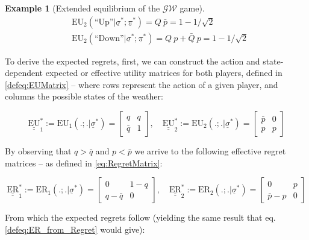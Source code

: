 \documentclass{article}
\theoremstyle{definition}
\newtheorem*{example}{Example}
\begin{document}
\begin{example}[Extended equilibrium of the $\mathcal{GW}$ game]
\begin{equation}
\begin{split}
& \mathrm{EU}_2(\text{``Up''} | \underline{\sigma}^*;\underline{\pi}^*) = Q \ \bar{p} = 1 - 1/\sqrt{2}\\
& \mathrm{EU}_2(\text{``Down''} | \underline{\sigma}^*;\underline{\pi}^*) = Q \ p + \bar{Q} \ p = 1 - 1/\sqrt{2}
\end{split}
\end{equation}

To derive the expected regrets, first, we can construct the action and state-dependent expected or effective utility matrices for both players, defined in \eqref{defeq:EUMatrix}  -- where rows represent the action of a given player, and columns the possible states of the weather:

\begin{equation}
    \underline{\underline{\mathrm{EU}}}^*_1
    :=
    \mathrm{EU}_1(.;.|\underline{\sigma}^*)
    =
    \begin{bmatrix}
        q & q \\
        \bar{q} & 1
    \end{bmatrix}, \quad
    \underline{\underline{\mathrm{EU}}}_2^*
    :=
    \mathrm{EU}_2(.;.|\underline{\sigma}^*)
    =
    \begin{bmatrix}
        \bar{p} & 0 \\
        p & p
    \end{bmatrix}
\end{equation}

By observing that $q > \bar{q}$ and $p < \bar{p}$ we arrive to the following effective regret matrices -- as defined in \eqref{eq:RegretMatrix}:

\begin{equation}
    \underline{\underline{\mathrm{ER}}}_1^*
    :=
    \mathrm{ER}_1(.;. | \underline{\sigma}^*)
    =
    \begin{bmatrix}
        0 & 1-q \\
        q-\bar{q} & 0
    \end{bmatrix}, \quad
    \underline{\underline{\mathrm{ER}}}_2^*
    :=
    \mathrm{ER}_2(.;. | \underline{\sigma}^*)
    =
    \begin{bmatrix}
        0 & p \\
        \bar{p} - p & 0
    \end{bmatrix}
\end{equation}

From which the expected regrets follow (yielding the same result that eq. \eqref{defeq:ER_from_Regret} would give):


\end{example}
\end{document}

